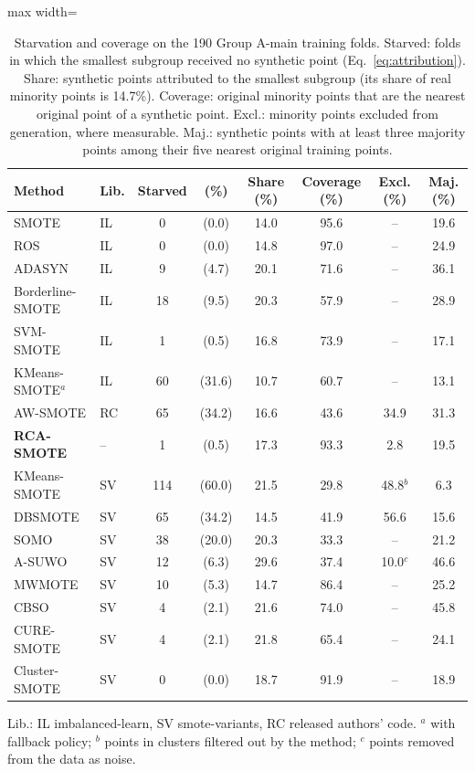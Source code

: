 \documentclass[preprint,nopreprintline]{elsarticle}
\theoremstyle{plain}
\theoremstyle{definition}
\newcommand{\tabfont}{\fontsize{8}{9.4}\selectfont}
\providecommand{\botrule}{\bottomrule}
\begin{document}
\begin{table}[!htb]
\caption{Starvation and coverage on the 190 Group A-main training folds. Starved: folds in which the smallest subgroup received no synthetic point (Eq.~\ref{eq:attribution}). Share: synthetic points attributed to the smallest subgroup (its share of real minority points is 14.7\%). Coverage: original minority points that are the nearest original point of a synthetic point. Excl.: minority points excluded from generation, where measurable. Maj.: synthetic points with at least three majority points among their five nearest original training points.}\label{tab:starvation}
\centering\tabfont
\setlength{\tabcolsep}{3pt}
\begin{adjustbox}{max width=\textwidth}
\begin{tabular}{@{}llcccccc@{}}
\toprule
Method & Lib. & Starved & (\%) & Share (\%) & Coverage (\%) & Excl. (\%) & Maj. (\%) \\
\midrule
SMOTE & IL & 0 & (0.0) & 14.0 & 95.6 & -- & 19.6 \\
ROS & IL & 0 & (0.0) & 14.8 & 97.0 & -- & 24.9 \\
ADASYN & IL & 9 & (4.7) & 20.1 & 71.6 & -- & 36.1 \\
Borderline-SMOTE & IL & 18 & (9.5) & 20.3 & 57.9 & -- & 28.9 \\
SVM-SMOTE & IL & 1 & (0.5) & 16.8 & 73.9 & -- & 17.1 \\
KMeans-SMOTE$^{a}$ & IL & 60 & (31.6) & 10.7 & 60.7 & -- & 13.1 \\
AW-SMOTE & RC & 65 & (34.2) & 16.6 & 43.6 & 34.9 & 31.3 \\
\textbf{RCA-SMOTE} & -- & 1 & (0.5) & 17.3 & 93.3 & 2.8 & 19.5 \\
\midrule
KMeans-SMOTE & SV & 114 & (60.0) & 21.5 & 29.8 & 48.8$^{b}$ & 6.3 \\
DBSMOTE & SV & 65 & (34.2) & 14.5 & 41.9 & 56.6 & 15.6 \\
SOMO & SV & 38 & (20.0) & 20.3 & 33.3 & -- & 21.2 \\
A-SUWO & SV & 12 & (6.3) & 29.6 & 37.4 & 10.0$^{c}$ & 46.6 \\
MWMOTE & SV & 10 & (5.3) & 14.7 & 86.4 & -- & 25.2 \\
CBSO & SV & 4 & (2.1) & 21.6 & 74.0 & -- & 45.8 \\
CURE-SMOTE & SV & 4 & (2.1) & 21.8 & 65.4 & -- & 24.1 \\
Cluster-SMOTE & SV & 0 & (0.0) & 18.7 & 91.9 & -- & 18.9 \\
\botrule
\end{tabular}
\end{adjustbox}
\par\smallskip\raggedright\footnotesize Lib.: IL imbalanced-learn, SV smote-variants, RC released authors' code. $^{a}$ with fallback policy; $^{b}$ points in clusters filtered out by the method; $^{c}$ points removed from the data as noise.
\end{table}
\end{document}
